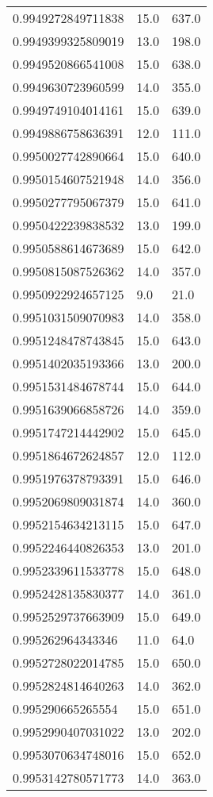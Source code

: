 \begin{center}
\begin{supertabular}[H]{p{0.30\textwidth}p{0.05\textwidth}p{0.05\textwidth}}
0.9949272849711838 & 15.0 & 637.0 \\ 
0.9949399325809019 & 13.0 & 198.0 \\ 
0.9949520866541008 & 15.0 & 638.0 \\ 
0.9949630723960599 & 14.0 & 355.0 \\ 
0.9949749104014161 & 15.0 & 639.0 \\ 
0.9949886758636391 & 12.0 & 111.0 \\ 
0.9950027742890664 & 15.0 & 640.0 \\ 
0.9950154607521948 & 14.0 & 356.0 \\ 
0.9950277795067379 & 15.0 & 641.0 \\ 
0.9950422239838532 & 13.0 & 199.0 \\ 
0.9950588614673689 & 15.0 & 642.0 \\ 
0.9950815087526362 & 14.0 & 357.0 \\ 
0.9950922924657125 & 9.0 & 21.0 \\ 
0.9951031509070983 & 14.0 & 358.0 \\ 
0.9951248478743845 & 15.0 & 643.0 \\ 
0.9951402035193366 & 13.0 & 200.0 \\ 
0.9951531484678744 & 15.0 & 644.0 \\ 
0.9951639066858726 & 14.0 & 359.0 \\ 
0.9951747214442902 & 15.0 & 645.0 \\ 
0.9951864672624857 & 12.0 & 112.0 \\ 
0.9951976378793391 & 15.0 & 646.0 \\ 
0.9952069809031874 & 14.0 & 360.0 \\ 
0.9952154634213115 & 15.0 & 647.0 \\ 
0.9952246440826353 & 13.0 & 201.0 \\ 
0.9952339611533778 & 15.0 & 648.0 \\ 
0.9952428135830377 & 14.0 & 361.0 \\ 
0.9952529737663909 & 15.0 & 649.0 \\ 
0.995262964343346 & 11.0 & 64.0 \\ 
0.9952728022014785 & 15.0 & 650.0 \\ 
0.9952824814640263 & 14.0 & 362.0 \\ 
0.995290665265554 & 15.0 & 651.0 \\ 
0.9952990407031022 & 13.0 & 202.0 \\ 
0.9953070634748016 & 15.0 & 652.0 \\ 
0.9953142780571773 & 14.0 & 363.0 \\ 

\end{supertabular}
\end{center}
